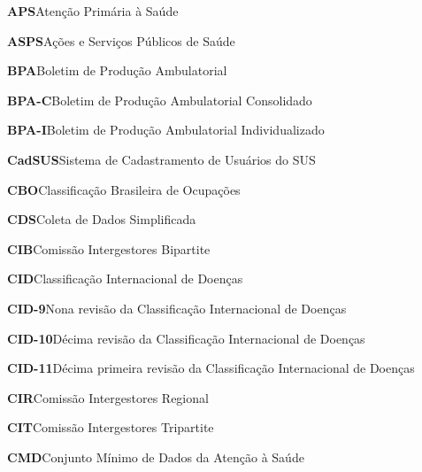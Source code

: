 \noindent\textbf{APS}\hspace{1em}Atenção Primária à Saúde\par\smallskip
\noindent\textbf{ASPS}\hspace{1em}Ações e Serviços Públicos de Saúde\par\smallskip
\noindent\textbf{BPA}\hspace{1em}Boletim de Produção Ambulatorial\par\smallskip
\noindent\textbf{BPA-C}\hspace{1em}Boletim de Produção Ambulatorial Consolidado\par\smallskip
\noindent\textbf{BPA-I}\hspace{1em}Boletim de Produção Ambulatorial Individualizado\par\smallskip
\noindent\textbf{CadSUS}\hspace{1em}Sistema de Cadastramento de Usuários do SUS\par\smallskip
\noindent\textbf{CBO}\hspace{1em}Classificação Brasileira de Ocupações\par\smallskip
\noindent\textbf{CDS}\hspace{1em}Coleta de Dados Simplificada\par\smallskip
\noindent\textbf{CIB}\hspace{1em}Comissão Intergestores Bipartite\par\smallskip
\noindent\textbf{CID}\hspace{1em}Classificação Internacional de Doenças\par\smallskip
\noindent\textbf{CID-9}\hspace{1em}Nona revisão da Classificação Internacional de Doenças\par\smallskip
\noindent\textbf{CID-10}\hspace{1em}Décima revisão da Classificação Internacional de Doenças\par\smallskip
\noindent\textbf{CID-11}\hspace{1em}Décima primeira revisão da Classificação Internacional de Doenças\par\smallskip
\noindent\textbf{CIR}\hspace{1em}Comissão Intergestores Regional\par\smallskip
\noindent\textbf{CIT}\hspace{1em}Comissão Intergestores Tripartite\par\smallskip
\noindent\textbf{CMD}\hspace{1em}Conjunto Mínimo de Dados da Atenção à Saúde\par\smallskip
